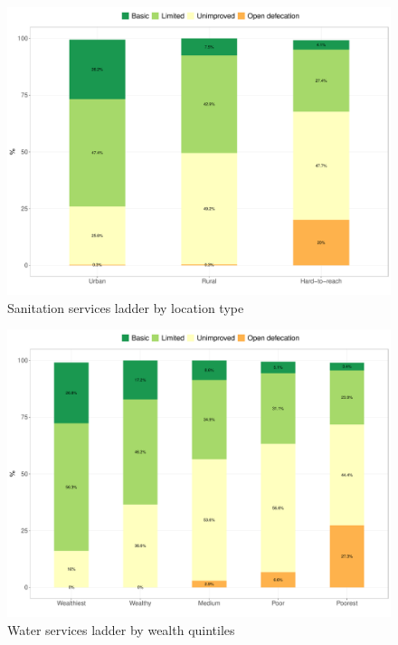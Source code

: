 \documentclass[12pt,a4paper]{article}
\begin{document}
\begin{figure}[H]

{\centering \includegraphics{kayahReport_files/figure-latex/san1plot-1} 

}

\caption{Sanitation services ladder by location type}\label{fig:san1plot}
\end{figure}

\begin{figure}[H]

{\centering \includegraphics{kayahReport_files/figure-latex/san2plot-1} 

}

\caption{Water services ladder by wealth quintiles}\label{fig:san2plot}
\end{figure}
\end{document}
